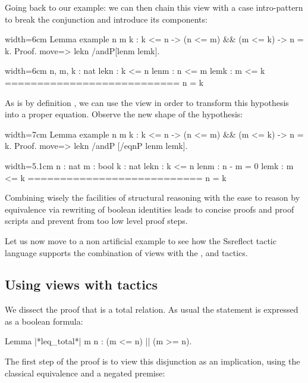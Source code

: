 Going back to  our example: we can then chain this view with a case
intro-pattern to break the conjunction and introduce its components:

\begin{coq}{}{width=6cm}
Lemma example n m k : k <= n ->
  (n <= m) && (m <= k) -> n = k.
Proof.
move=> lekn /andP[lenm lemk].
\end{coq}
\begin{coqout}{}{width=6cm}
n, m, k : nat
lekn : k <= n
lenm : n <= m
lemk : m <= k
===========================
n = k
\end{coqout}

As  is by definition , we can use the view
 in order to transform this hypothesis into a proper equation.
Observe the new shape of the  hypothesis:

\begin{coq}{}{width=7cm}
Lemma example n m k : k <= n ->
  (n <= m) && (m <= k) -> n = k.
Proof.
move=> lekn /andP [/eqnP lenm lemk].
\end{coq}
\begin{coqout}{}{width=5.1cm}
n : nat
m : bool
k : nat
lekn : k <= n
lenm : n - m = 0
lemk : m <= k
===========================
n = k
\end{coqout}

Combining wisely the facilities of  structural reasoning with
the ease to reason by equivalence via rewriting of boolean identities
leads to concise proofs and proof scripts and prevent from too low
level proof steps. 

Let us now move to a non artificial example to see how the Ssreflect
tactic language supports the combination of views with the ,
 and  tactics.

\subsection{Using views with tactics}\label{sec:viewtac}

We dissect the proof that \C{<=} is a total relation.
As usual the statement is expressed as a boolean formula:

\begin{coq}{}{}
Lemma |*leq_total*| m n : (m <= n) || (m >= n).
\end{coq}

The first step of the proof is to view this disjunction as an
implication, using the classical equivalence and a negated premise:

